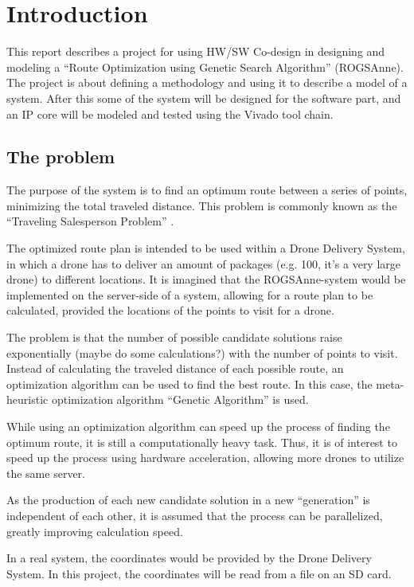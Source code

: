 
\chapter{Introduction}
This report describes a project for using HW/SW Co-design in designing and modeling a “Route Optimization using Genetic Search Algorithm” (ROGSAnne).
The project is about defining a methodology and using it to describe a model of a system. After this some of the system will be designed for the software part, and an IP core will be modeled and tested using the Vivado tool chain.

\section{The problem}
The purpose of the system is to find an optimum route between a series of points, minimizing the total traveled distance. This problem is commonly known as the “Traveling Salesperson Problem” \cite{wiki:TSP}.

The optimized route plan is intended to be used within a Drone Delivery System, in which a drone has to deliver an amount of packages (e.g. 100, it’s a very large drone) to different locations. It is imagined that the ROGSAnne-system would be implemented on the server-side of a system, allowing for a route plan to be calculated, provided the locations of the points to visit for a drone.

The problem is that the number of possible candidate solutions raise exponentially (maybe do some calculations?) with the number of points to visit. Instead of calculating the traveled distance of each possible route, an optimization algorithm can be used to find the best route. In this case, the meta-heuristic optimization algorithm “Genetic Algorithm” is used.

While using an optimization algorithm can speed up the process of finding the optimum route, it is still a computationally heavy task. Thus, it is of interest to speed up the process using hardware acceleration, allowing more drones to utilize the same server.

As the production of each new candidate solution in a new “generation” is independent of each other, it is assumed that the process can be parallelized, greatly improving calculation speed.

In a real system, the coordinates would be provided by the Drone Delivery System. In this project, the coordinates will be read from a file on an SD card.